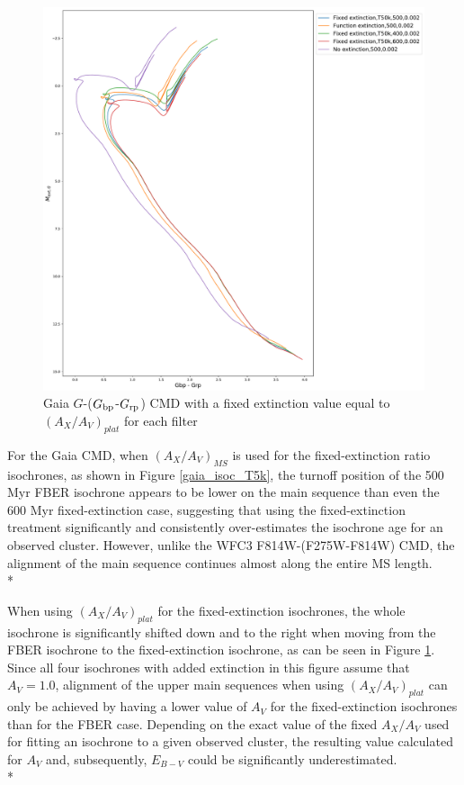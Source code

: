 \documentclass[12pt, a4paper]{report}
\begin{document}
\begin{figure}[h]
\begin{center}
\includegraphics[width=1.0\textwidth]{../basti_isochrones_10_13Gyr/Extinction_T50k_FeH0fix_func_G_GbpmGrp_500_400_600_Myr_FeH_0p002_ref_noext_Av_1p0.pdf}
\caption{Gaia $G$-($G_{\textnormal{bp}}$-$G_{\textnormal{rp}}$) CMD with a fixed extinction value equal to $(A_{X}/A_{V})_{plat}$ for each filter}
\label{gaia_isoc_T50k}
\end{center}
\end{figure}

For the Gaia CMD, when $(A_{X}/A_{V})_{MS}$ is used for the fixed-extinction ratio isochrones, as shown in Figure \ref{gaia_isoc_T5k}, the turnoff position of the 500 Myr FBER isochrone appears to be lower on the main sequence than even the 600 Myr fixed-extinction case, suggesting that using the fixed-extinction treatment significantly and consistently over-estimates the isochrone age for an observed cluster. However, unlike the WFC3 F814W-(F275W-F814W) CMD, the alignment of the main sequence continues almost along the  entire MS length. \\*

When using $(A_{X}/A_{V})_{plat}$ for the fixed-extinction isochrones, the whole isochrone is significantly shifted down and to the right when moving from the FBER isochrone to the fixed-extinction isochrone, as can be seen in Figure \ref{gaia_isoc_T50k}. Since all four isochrones with added extinction in this figure assume that $A_{V} = 1.0$, alignment of the upper main sequences when using $(A_{X}/A_{V})_{plat}$ can only be achieved by having a lower value of $A_{V}$ for the fixed-extinction isochrones than for the FBER case. Depending on the exact value of the fixed $A_{X}/A_{V}$ used for fitting an isochrone to a given observed cluster, the resulting value calculated for $A_{V}$ and, subsequently, $E_{B-V}$ could be significantly underestimated. \\*
\end{document}
